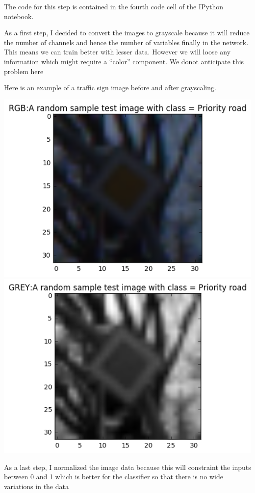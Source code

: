 \documentclass[11pt]{article}
\makeatletter
\def\maxwidth{\ifdim\Gin@nat@width>\linewidth\linewidth
    \else\Gin@nat@width\fi}
\let\Oldincludegraphics\includegraphics
\renewcommand{\includegraphics}[1]{\Oldincludegraphics[width=.8\maxwidth]{#1}}
\makeatother
\begin{document}
The code for this step is contained in the fourth code cell of the
IPython notebook.

As a first step, I decided to convert the images to grayscale because it
will reduce the number of channels and hence the number of variables
finally in the network. This means we can train better with lesser data.
However we will loose any information which might require a ``color''
component. We donot anticipate this problem here

Here is an example of a traffic sign image before and after grayscaling.

\includegraphics{./examples/grayscale-before.png}
\includegraphics{./examples/grayscale-after.png}

As a last step, I normalized the image data because this will constraint
the inputs between 0 and 1 which is better for the classifier so that
there is no wide variations in the data
\end{document}
